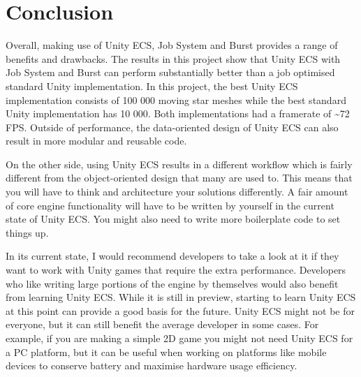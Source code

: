 \chapter{Conclusion}
Overall, making use of Unity ECS, Job System and Burst provides a range of benefits and drawbacks. The results in this project show that Unity ECS with Job System and Burst can perform substantially better than a job optimised standard Unity implementation. In this project, the best Unity ECS implementation consists of 100 000 moving star meshes while the best standard Unity implementation has 10 000. Both implementations had a framerate of \textasciitilde72 FPS. Outside of performance, the data-oriented design of Unity ECS can also result in more modular and reusable code. 

On the other side, using Unity ECS results in a different workflow which is fairly different from the object-oriented design that many are used to. This means that you will have to think and architecture your solutions differently. A fair amount of core engine functionality will have to be written by yourself in the current state of Unity ECS. You might also need to write more boilerplate code to set things up. 

In its current state, I would recommend developers to take a look at it if they want to work with Unity games that require the extra performance. Developers who like writing large portions of the engine by themselves would also benefit from learning Unity ECS. While it is still in preview, starting to learn Unity ECS at this point can provide a good basis for the future. Unity ECS might not be for everyone, but it can still benefit the average developer in some cases. For example, if you are making a simple 2D game you might not need Unity ECS for a PC platform, but it can be useful when working on platforms like mobile devices to conserve battery and maximise hardware usage efficiency. 
